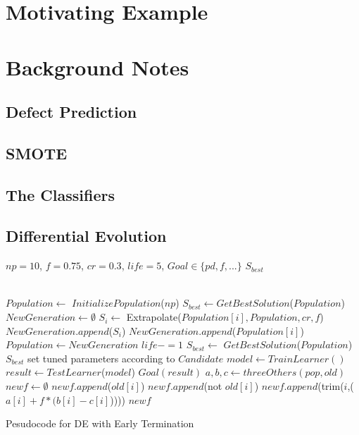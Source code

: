 \documentclass[12pt, journal, compsoc]{IEEEtran}
\begin{document}
\section{Motivating Example}
\label{motivation}
\section{Background Notes}
\label{back}
\subsection{Defect Prediction}
\subsection{SMOTE}
\subsection{The Classifiers}
\subsection{Differential Evolution}
\begin{algorithm}[htbp!]
  
  \scriptsize
  \begin{algorithmic}[1]
    \Require $\mathit{np} = 10$, $f=0.75$, $cr=0.3$, $\mathit{life} = 5$, $\mathit{Goal} \in \{\mathit{pd},f,...\}$
    \Ensure $S_{best}$
    
    ~\\
    \State $Population  \gets $ $InitializePopulation$($\mathit{np}$)   
    \State $S_{best} \gets $$GetBestSolution$($Population $)
    \State $NewGeneration \gets \emptyset$
    \State $S_i \gets$ Extrapolate($Population [i], Population , cr, f$)
    \State $NewGeneration$.$append$($S_i$)
    \Else
    \State $NewGeneration$.$append$($Population [i]$)
    \EndIf
    \EndFor
    \State $Population  \gets NewGeneration$
    \State $life -=1$
    \EndIf
    \State $S_{best} \gets$ $GetBestSolution$($Population $)
    \EndWhile
    \State \Return $S_{best}$
    \EndFunction
    \State set tuned parameters according to $Candidate$
    \State $model \gets$$TrainLearner()$
    \State $result \gets$$TestLearner$($model$)   
    \State \Return$\mathit{Goal}(result)$  
    \EndFunction
    \State $a, b, c\gets threeOthers(pop,old)$  
    \State $newf \gets \emptyset$
    \State $newf$.$append$($old[i]$)
    \Else
    \State $newf$.$append$(not $old[i]$)
    \Else
    \State $newf$.$append$(trim($i$,($a[i] + f * (b[i] - c[i]$)))) 
    \EndIf
    \EndIf
    \EndFor
    \State \Return $newf$
    \EndFunction
  \end{algorithmic} 
  \caption{Pesudocode for DE with Early Termination}
  \label{alg:DE}
\end{algorithm}
\end{document}
